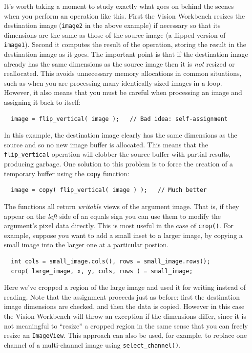 It's worth taking a moment to study exactly what goes on behind 
the scenes when you perform an operation like this.  First the 
Vision Workbench resizes the destination image (\verb#image2# 
in the above example) if necessary so that its dimensions are 
the same as those of the source image (a flipped version of 
\verb#image1#).  Second it computes the result of the operation, 
storing the result in the destination image as it goes.  The 
important point is that if the destination image already has the 
same dimensions as the source image then it is {\it not} resized 
or reallocated.  This avoids unnecessary memory allocations in 
common situations, such as when you are processing many 
identically-sized images in a loop.  However, it also means that 
you must be careful when processing an image and assigning it back 
to itself:
\begin{verbatim}
  image = flip_vertical( image );   // Bad idea: self-assignment
\end{verbatim}
In this example, the destination image clearly has the same 
dimensions as the source and so no new image buffer is allocated. 
This means that the \verb#flip_vertical# operation will clobber 
the source buffer with partial results, producing garbage.  One 
solution to this problem is to force the creation of a temporary 
buffer using the \verb#copy# function:
\begin{verbatim}
  image = copy( flip_vertical( image ) );   // Much better
\end{verbatim}

The functions all return {\it writable} views of the argument image.
That is, if they appear on the {\it left} side of an equals sign you
can use them to modify the argument's pixel data directly.  This is
most useful in the case of \verb#crop()#.  For example, suppose you
want to add a small inset to a larger image, by copying a small 
image into the larger one at a particular postion.
\begin{verbatim}
  int cols = small_image.cols(), rows = small_image.rows();
  crop( large_image, x, y, cols, rows ) = small_image;
\end{verbatim}
Here we've cropped a region of the large image and used it for writing
instead of reading.  Note that the assignment proceeds just as before: 
first the destination image dimensions are checked, and then the data 
is copied.  However in this case the Vision Workbench will throw an 
exception if the dimensions differ, since it is not meaningful to 
``resize'' a cropped region in the same sense that you can freely 
resize an \verb#ImageView#.  This approach can also be used, for example, 
to replace one channel of a multi-channel image using
\verb#select_channel()#.

